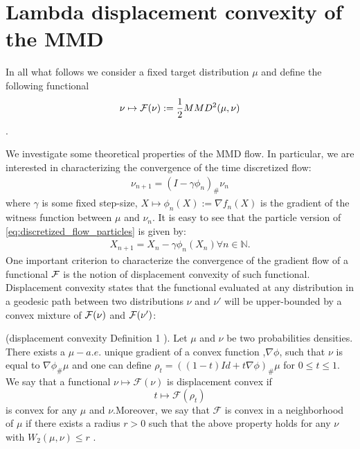 


\section{Lambda displacement convexity of the MMD}
In all what follows we consider a fixed target distribution $\mu$ and define the following functional 
\begin{align}\label{eq:MMD_functional}
	\nu \mapsto {{\mathcal F}}(\nu):=\frac{1}{2} MMD^2(\mu,\nu)\textbf{}
\end{align}. 

We investigate some theoretical properties of the MMD flow. In particular, we are interested in characterizing the convergence of the time discretized flow:
	\begin{align}\label{eq:discretized_flow}
		\nu_{n+1} = (I -\gamma \phi_n)_{\#}\nu_n
	\end{align}
where $\gamma$ is some fixed step-size, $X \mapsto \phi_n(X):=\nabla f_{n}(X)$ is the gradient of the witness function between $\mu$ and $\nu_n$. It is easy to see that the particle version of \cref{eq:discretized_flow_particles} is given by:
\begin{align}
	X_{n+1} = X_n - \gamma \phi_n(X_n) \forall n\in \mathbb{N}.
\end{align} 
One important criterion to characterize the convergence of the gradient flow of a functional ${{\mathcal F}}$ is the notion of displacement convexity of such functional. Displacement convexity states that the functional evaluated at any distribution in a geodesic path between two distributions $\nu$ and $\nu'$ will be upper-bounded by a convex mixture of ${{\mathcal F}}(\nu)$ and ${{\mathcal F}}(\nu')$:
\begin{definition}\label{def:displacement_convexity}
(displacement convexity \cite{Villani:2004} Definition 1 ). Let $\mu$
and $\nu$ be two probabilities densities. There exists a $\mu-a.e.$
unique gradient of a convex function ,$\nabla\phi$, such that $\nu$
is equal to $\nabla\phi_{\#}\mu$ and one can define $\rho_{t}=((1-t)Id+t\nabla\phi)_{\#}\mu$
for $0\leq t\leq1$. We say that a functional $\nu\mapsto\mathcal{F}(\nu)$
is displacement convex if 
\[
t\mapsto\mathcal{F}(\rho_{t})
\]
 is convex for any $\mu$ and $\nu$.Moreover, we say that $\mathcal{F}$
is convex in a neighborhood of $\mu$ if there exists a radius $r>0$
such that the above property holds for any $\nu$ with $W_{2}(\mu,\nu)\leq r$
.
\end{definition}


